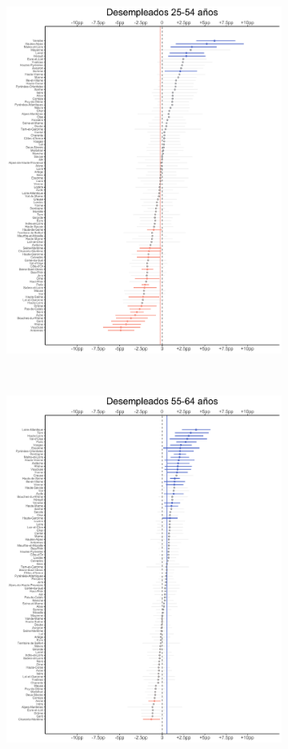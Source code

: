 \begin{figure}
\begin{subfigure}{0.3\textwidth}
	\includegraphics[width = \textwidth]{Figs/Efectos/Efectos_Des2_Modelo_H}
	\end{subfigure}
	~
	\begin{subfigure}{0.3\textwidth}
	\includegraphics[width = \textwidth]{Figs/Efectos/Efectos_Des3_Modelo_H}

\end{subfigure}
\end{figure}
